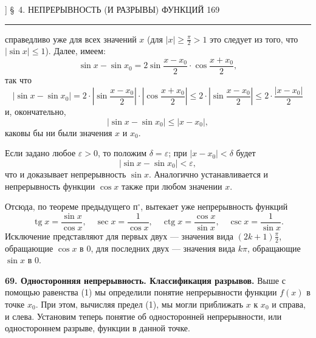 \documentclass[a4paper,12pt]{article}
\begin{document}
\newpage
{}] \hfill \S~4. НЕПРЕРЫВНОСТЬ (И РАЗРЫВЫ) ФУНКЦИЙ \hfill 169
\vspace{0.5em}
\hrule
\vspace{1em}

\noindent справедливо уже для всех значений $x$ (для $|x| \ge \frac{\pi}{2} > 1$ это следует из того, что $|\sin x| \le 1$). Далее, имеем:
\begin{equation*}
    \sin x - \sin x_0 = 2 \sin \frac{x - x_0}{2} \cdot \cos \frac{x + x_0}{2},
\end{equation*}
так что
\begin{equation*}
    |\sin x - \sin x_0| = 2 \cdot \left| \sin \frac{x - x_0}{2} \right| \cdot \left| \cos \frac{x + x_0}{2} \right| \le 2 \cdot \left| \sin \frac{x - x_0}{2} \right| \le 2 \cdot \frac{|x - x_0|}{2}
\end{equation*}
и, окончательно,
\begin{equation}
    |\sin x - \sin x_0| \le |x - x_0|,
\end{equation}
каковы бы ни были значения $x$ и $x_0$.

Если задано любое $\varepsilon > 0$, то положим $\delta = \varepsilon$; при $|x - x_0| < \delta$ будет
\begin{equation*}
    |\sin x - \sin x_0| < \varepsilon,
\end{equation*}
что и доказывает непрерывность $\sin x$. Аналогично устанавливается и непрерывность функции $\cos x$ также при любом значении $x$.

Отсюда, по теореме предыдущего п$^\circ$, вытекает уже непрерывность функций
\begin{equation*}
    \operatorname{tg} x = \frac{\sin x}{\cos x}, \quad \sec x = \frac{1}{\cos x}, \quad \operatorname{ctg} x = \frac{\cos x}{\sin x}, \quad \csc x = \frac{1}{\sin x}.
\end{equation*}
Исключение представляют для первых двух --- значения вида $(2k + 1)\frac{\pi}{2}$, обращающие $\cos x$ в 0, для последних двух --- значения вида $k\pi$, обращающие $\sin x$ в 0.

\vspace{1em}
\noindent \textbf{69. Односторонняя непрерывность. Классификация разрывов.} Выше с помощью равенства (1) мы определили понятие непрерывности функции $f(x)$ в точке $x_0$. При этом, вычисляя предел (1), мы могли приближать $x$ к $x_0$ и справа, и слева. Установим теперь понятие об односторонней непрерывности, или одностороннем разрыве, функции в данной точке.
\end{document}

